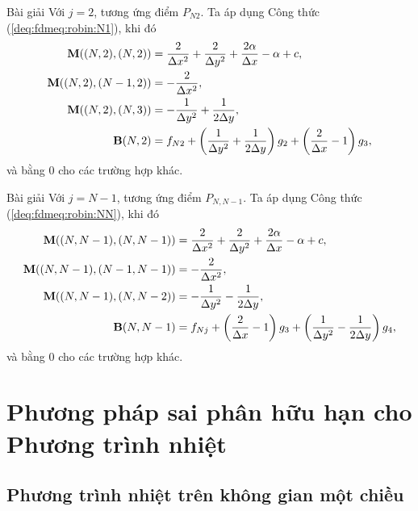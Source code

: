 \documentclass[9pt]{beamer}
\numberwithin{equation}{section}
\begin{document}
\begin{frame}
\begin{exampleblock}{Bài giải}
    Với $j=2$, tương ứng điểm $P_{N2}$. Ta áp dụng Công thức (\ref{deq:fdmeq:robin:N1}), khi đó
    \begin{align*}
        {\bf M}((N,2),(N,2)) &= \frac{2}{\Delta x^2} + \frac{2}{\Delta y^2} + \frac{2\alpha}{\Delta x} - \alpha + c, \\
        {\bf M}((N,2),(N-1,2)) &= -\frac{2}{\Delta x^2}, \\
        {\bf M}((N,2),(N,3)) &= -\frac{1}{\Delta y^2} + \frac{1}{2\Delta y}, \\
        {\bf B}(N,2) &= f_{N2} + \left(\frac{1}{\Delta y^2} + \frac{1}{2\Delta y}\right) g_2 + \left(\frac{2}{\Delta x} - 1\right) g_3,
    \end{align*}
    và bằng 0 cho các trường hợp khác.
\end{exampleblock}
\end{frame}

\begin{frame}
\begin{exampleblock}{Bài giải}
    Với $j=N-1$, tương ứng điểm $P_{N,N-1}$. Ta áp dụng Công thức (\ref{deq:fdmeq:robin:NN}), khi đó
    \begin{align*}
        {\bf M}((N,N-1),(N,N-1)) &= \frac{2}{\Delta x^2} + \frac{2}{\Delta y^2} + \frac{2\alpha}{\Delta x} - \alpha + c, \\
        {\bf M}((N,N-1),(N-1,N-1)) &= -\frac{2}{\Delta x^2}, \\
        {\bf M}((N,N-1),(N,N-2)) &= -\frac{1}{\Delta y^2} - \frac{1}{2\Delta y}, \\
        {\bf B}(N,N-1) &= f_{Nj} + \left(\frac{2}{\Delta x} - 1\right) g_3 + \left(\frac{1}{\Delta y^2} - \frac{1}{2\Delta y}\right) g_4,
    \end{align*}
    và bằng 0 cho các trường hợp khác.
\end{exampleblock}
\end{frame}

\section{Phương pháp sai phân hữu hạn cho Phương trình nhiệt}

\subsection{Phương trình nhiệt trên không gian một chiều}
\end{document}
